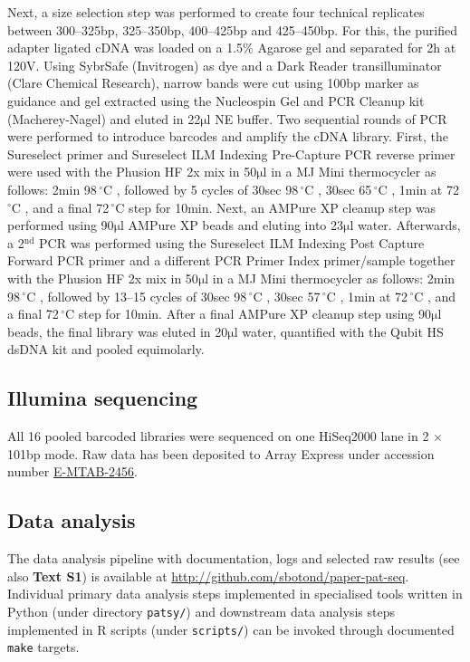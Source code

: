 \documentclass[10pt]{article}
\newcommand{\mul}{\ensuremath{\mathrm{\mu l}} }
\newcommand{\C}{\,$^{\circ}\mathrm{C}$ }
\begin{document}
Next, a size selection step was performed to create four technical replicates between 300--325bp, 325--350bp, 400--425bp and 425--450bp. For this, the purified adapter ligated cDNA was loaded on a 1.5\% Agarose gel and separated for 2h at 120V. Using SybrSafe (Invitrogen) as dye and a Dark Reader transilluminator (Clare Chemical Research), narrow bands were cut using 100bp marker as guidance and gel extracted using the Nucleospin Gel and PCR Cleanup kit (Macherey-Nagel) and eluted in 22\mul NE buffer.
Two sequential rounds of PCR were performed to introduce barcodes and amplify the cDNA library. First, the Sureselect primer and Sureselect ILM Indexing Pre-Capture PCR reverse primer were used with the Phusion HF 2x mix in 50\mul in a MJ Mini thermocycler as follows: 2min 98\C, followed by 5 cycles of 30sec 98\C, 30sec 65\C, 1min at 72\C, and a final 72\C step for 10min. Next, an AMPure XP cleanup step was performed using 90\mul AMPure XP beads and eluting into 23\mul water. Afterwards, a 2$^\mathrm{nd}$ PCR was performed using the Sureselect ILM Indexing Post Capture Forward PCR primer and a different PCR Primer Index primer/sample together with the Phusion HF 2x mix in 50\mul in a MJ Mini thermocycler as follows: 2min 98\C, followed by 13--15 cycles of 30sec 98\C, 30sec 57\C, 1min at 72\C, and a final 72\C step for 10min. After a final AMPure XP cleanup step using 90\mul beads, the final library was eluted in 20\mul water, quantified with the Qubit HS dsDNA kit and pooled equimolarly.

\subsection*{Illumina sequencing}

All 16 pooled barcoded libraries were sequenced on one HiSeq2000 lane in 2 $\times$ 101bp mode. Raw data has been deposited to Array Express under accession number \href{http://www.ebi.ac.uk/arrayexpress/experiments/E-MTAB-2456/}{E-MTAB-2456}.

\subsection*{Data analysis}

The data analysis pipeline with documentation, logs and selected raw results (see also \textbf{Text S1}) is available at \href{http://github.com/sbotond/paper-pat-seq}{http://github.com/sbotond/paper-pat-seq}. Individual primary data analysis steps implemented in specialised tools written in Python (under directory \texttt{patsy/})  and downstream data analysis steps implemented in R scripts (under \texttt{scripts/}) can be invoked through documented \texttt{make} targets.
\end{document}
